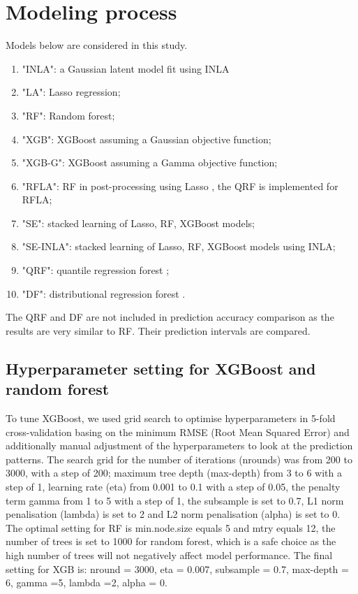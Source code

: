 \documentclass{article}
\begin{document}
\section{Modeling process}
 
Models below are considered in this study. 
\begin{enumerate}
\item "INLA": a Gaussian latent model fit using INLA %
\item "LA": Lasso regression; 
\item "RF": Random forest; 
\item "XGB": XGBoost assuming a Gaussian objective function; 
\item "XGB-G": XGBoost assuming a Gamma objective function; 
\item "RFLA": RF in post-processing using Lasso \citep{hastie2009elements}, the QRF is implemented for RFLA; 
\item "SE": stacked learning of Lasso, RF, XGBoost models; 
\item "SE-INLA": stacked learning of Lasso, RF, XGBoost models using INLA;
\item "QRF": quantile regression forest \citep{meinshausen2006quantile};
\item "DF": distributional regression forest \citep{schlosser2019distributional}.
\end{enumerate}

The QRF and DF are not included in prediction accuracy comparison as the results are very similar to RF. Their prediction intervals are compared. 

\subsection{Hyperparameter setting for XGBoost and random forest}
\label{sec:hp}

To tune XGBoost, we used grid search to optimise hyperparameters in 5-fold cross-validation basing on the minimum RMSE (Root Mean Squared Error) and additionally manual adjustment of the hyperparameters to look at the prediction patterns. The search grid for the number of iterations (nrounds) was from 200 to 3000, with a step of 200; maximum tree depth (max-depth) from 3 to 6 with a step of 1, learning rate (eta) from 0.001 to 0.1 with a step of 0.05, the penalty term gamma \citep{xgboost}  from 1 to 5 with a step of 1, the subsample is set to 0.7, L1 norm penalisation (lambda) is set to 2 and L2 norm penalisation (alpha) is set to 0.  The optimal setting for RF is min.node.size equals 5 and mtry equals 12, the number of trees is set to 1000 for random forest, which is a safe choice as the high number of trees will not negatively affect model performance. The final setting for XGB is: nround = 3000, eta = 0.007, subsample = 0.7, max-depth = 6, gamma =5, lambda =2, alpha = 0. 
\end{document}
